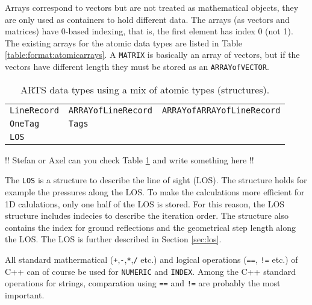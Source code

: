  \label{sec:formats:atomic_arrays}
 
 Arrays correspond to vectors but are not treated as mathematical
 objects, they are only used as containers to hold different data.
 The arrays (as vectors and matrices) have 0-based indexing, that is,
 the first element has index 0 (not 1). The existing arrays for the
 atomic data types are listed in Table \ref{table:format:atomicarrays}.
 A \verb|MATRIX| is basically an array of vectors, but if the vectors
 have different length they must be stored as an \verb|ARRAYofVECTOR|.


 \label{sec:formats:others}

 \begin{table}[t]
  \begin{tabular}{l l l}
   \verb|LineRecord| & \verb|ARRAYofLineRecord| & \verb|ARRAYofARRAYofLineRecord| \\
   \verb|OneTag|     & \verb|Tags|   & \\
   \verb|LOS| & & \\
  \end{tabular}
  \caption{ARTS data types using a mix of atomic types (structures).}
  \label{table:format:structures}
 \end{table}
 
 !! Stefan or Axel can you check Table \ref{table:format:structures} and
 write something here !!
 
 The \verb|LOS| is a structure to describe the line of sight (LOS).
 The structure holds for example the pressures along the LOS. To make the
 calculations more efficient for 1D calulations, only one half of the
 LOS is stored.  For this reason, the LOS structure includes indecies
 to describe the iteration order. The structure also contains the
 index for ground reflections and the geometrical step length along
 the LOS. The LOS is further described in Section \ref{sec:los}.


 \label{sec:formats:maths}
 
 All standard mathermatical (\verb|+|,\verb|-|,\verb|*|,\verb|/| etc.)
 and logical operations (\verb|==|, \verb|!=| etc.) of C++ can of
 course be used for \verb|NUMERIC| and \verb|INDEX|. Among the C++
 standard operations for strings, comparation using \verb|==| and
 \verb|!=| are probably the most important.

 
 
